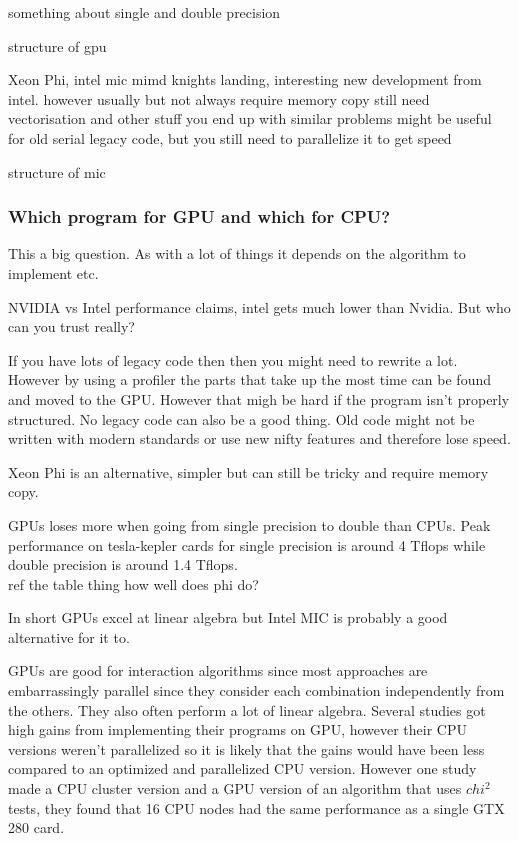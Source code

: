 \documentclass[10pt,a4paper]{article}
\begin{document}
something about single and double precision

structure of gpu

Xeon Phi, intel mic
mimd
knights landing, interesting new development from intel.
however usually but not always require memory copy
still need vectorisation and other stuff
you end up with similar problems
might be useful for old serial legacy code, but you still need to parallelize it to get speed

structure of mic

\subsubsection{Which program for GPU and which for CPU?}
\label{gpu_gwas}
This a big question. As with a lot of things it depends on the algorithm to implement etc.

NVIDIA vs Intel performance claims, intel gets much lower than Nvidia. But who can you trust really?

If you have lots of legacy code then then you might need to rewrite a lot. However by using a profiler the parts that take up the most time can be found and moved to the GPU. However that migh be hard if the program isn't properly structured. No legacy code can also be a good thing. Old code might not be written with modern standards or use new nifty features and therefore lose speed.

Xeon Phi is an alternative, simpler but can still be tricky and require memory copy.

GPUs loses more when going from single precision to double than CPUs. Peak performance on tesla-kepler cards for single precision is around 4 Tflops while double precision is around 1.4 Tflops. \cite{nvtesla}\\ ref the table thing how well does phi do?

In short GPUs excel at linear algebra but Intel MIC is probably a good alternative for it to.

GPUs are good for interaction algorithms since most approaches are embarrassingly parallel since they consider each combination independently from the others. They also often perform a lot of linear algebra. Several studies got high gains from implementing their programs on GPU, however their CPU versions weren't parallelized so it is likely that the gains would have been less compared to an optimized and parallelized CPU version.\cite{gwis,gboost,gmdr_gpu,cuda_lr,genie_2012,plink_gpu} However one study made a CPU cluster version and a GPU version of an algorithm that uses $chi^2$ tests, they found that 16 CPU nodes had the same performance as a single GTX 280 card\cite{jiang_accelerating}.
\end{document}
